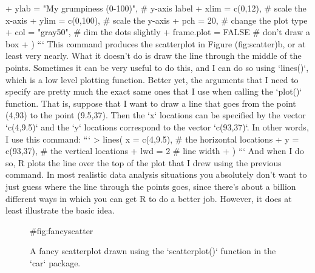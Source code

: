 +       ylab = "My grumpiness (0-100)",   # y-axis label
+       xlim = c(0,12),                   # scale the x-axis
+       ylim = c(0,100),                  # scale the y-axis
+       pch = 20,                         # change the plot type
+       col = "gray50",                   # dim the dots slightly
+       frame.plot = FALSE                # don't draw a box
+ )
```
This command produces the scatterplot in Figure \@ref(fig:scatter)b, or at least very nearly. What it doesn't do is draw the line through the middle of the points. Sometimes it can be very useful to do this, and I can do so using `lines()`, which is a low level plotting function. Better yet, the arguments that I need to specify are pretty much the exact same ones that I use when calling the `plot()` function. That is, suppose that I want to draw a line that goes from the point (4,93) to the point (9.5,37). Then the `x` locations can be specified by the vector `c(4,9.5)` and the `y` locations correspond to the vector `c(93,37)`. In other words, I use this command:
```
> lines( x = c(4,9.5),   # the horizontal locations
+        y = c(93,37),   # the vertical locations
+        lwd = 2         # line width
+ )
```
And when I do so, R plots the line over the top of the plot that I drew using the previous command. In most realistic data analysis situations you absolutely don't want to just guess where the line through the points goes, since there's about a billion different ways in which you can get R to do a better job. However, it does at least illustrate the basic idea. 


\begin{figure}[t]
\begin{center}
\caption{A fancy scatterplot drawn using the `scatterplot()` function in the `car` package.}
\HR
{#fig:fancyscatter}
\end{center}
\end{figure}

